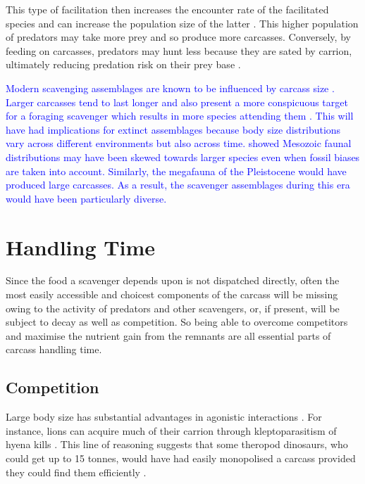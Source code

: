 \documentclass[a4paper,12pt]{article}
\begin{document}
This type of facilitation then increases the encounter rate of the facilitated species and can increase the population size of the latter \citep{moleon2014inter}. 
This higher population of predators may take more prey and so produce more carcasses.
Conversely, by feeding on carcasses, predators may hunt less because they are sated by carrion, ultimately reducing predation risk on their prey base \citep{moleon2014inter}. 

\textcolor{blue}{Modern scavenging assemblages are known to be influenced by carcass size \citep{moleon2015carcass}. 
Larger carcasses tend to last longer and also present a more conspicuous target for a foraging scavenger which results in more species attending them \citep{moleon2015carcass}.
This will have had implications for extinct assemblages because body size distributions vary across different environments but also across time. 
\cite{10.1371/journal.pone.0051925} showed Mesozoic faunal distributions may have been skewed towards larger species even when fossil biases are taken into account. 
Similarly, the megafauna of the Pleistocene \citep{doughty2013legacy} would have produced large carcasses. 
As a result, the scavenger assemblages during this era would have been particularly diverse.}

\section{Handling Time}
\label{handlingTime}
Since the food a scavenger depends upon is not dispatched directly, often the most easily accessible and choicest components of the carcass will be missing owing to the activity of predators and other scavengers, or, if present, will be subject to decay as well as competition.
So being able to overcome competitors and maximise the nutrient gain from the remnants are all essential parts of carcass handling time. 

\subsection{Competition}
Large body size has substantial advantages in agonistic interactions \textcolor{blue}{\citep{ruxton2004obligate,moleon2014inter,pereira2014facultative}}. 
For instance, lions can acquire much of their carrion through kleptoparasitism of hyena kills \textcolor{blue}{\citep{trinkel2005competitive,pereira2014facultative,periquet2015lion}}. 
This line of reasoning suggests that some theropod dinosaurs, who could get up to 15 tonnes, would have had easily monopolised a carcass \citep{weishampel2004dinosauria} provided they could find them efficiently \citep{kane2016body}. 
\end{document}
